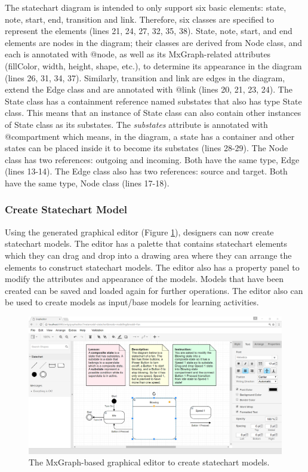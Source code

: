 \documentclass[12pt, a4paper]{report} \usepackage[titletoc]{appendix}
\begin{document}
The statechart diagram is intended to only support six basic elements: state, note, start, end, transition and link. Therefore, six classes are specified to represent the elements (lines 21, 24, 27, 32, 35, 38). State, note, start, and end elements are nodes in the diagram; their classes are derived from Node class, and each is annotated with {\selectfont @node}, as well as its MxGraph-related attributes (fillColor, width, height, shape, etc.), to determine its appearance in the diagram (lines 26, 31, 34, 37). Similarly, transition and link are edges in the diagram, extend the Edge class and are annotated with {\selectfont @link} (lines 20, 21, 23, 24). The State class has a containment reference named substates that also has type State class. This means that an instance of State class can also contain other instances of State class as its substates. The \emph{substates} attribute is annotated with {\selectfont @compartment} which means, in the diagram, a state has a container and other states can be placed inside it to become its substates (lines 28-29). The Node class has two references: outgoing and incoming. Both have the same type, Edge (lines 13-14). The Edge class also has two references: source and target. Both have the same type, Node class (lines 17-18).



\subsubsection{Create Statechart Model}
Using the generated graphical editor (Figure \ref{ide}), designers can now create statechart models. The editor has a palette that contains statechart elements which they can drag and drop into a drawing area where they can arrange the elements to construct statechart models. The editor also has a property panel to modify the attributes and appearance of the models. Models that have been created can be saved and loaded again for further operations. The editor also can be used to create models as input/base models for learning activities.        

\begin{figure}[t!]
\centering
\includegraphics[width=12cm]{ide}
\caption{The MxGraph-based graphical editor to create statechart models.}
\label{ide}
\end{figure}
\end{document}
